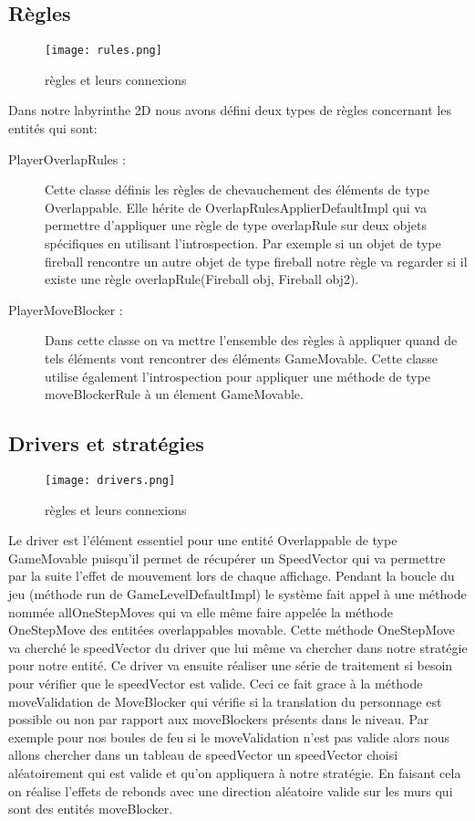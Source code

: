 \documentclass{article}
\begin{document}
\subsection{Règles}

\begin{figure}[!h]
\centering
\texttt{[image: rules.png]}
\caption[Entitées]{règles et leurs connexions}
\end{figure}

Dans notre labyrinthe 2D nous avons défini deux types de règles concernant les entités qui sont:
\begin{description}
\item[PlayerOverlapRules :]Cette classe définis les règles de chevauchement des éléments de type Overlappable. Elle hérite de OverlapRulesApplierDefaultImpl qui va permettre d'appliquer une règle de type overlapRule sur deux objets spécifiques en utilisant l'introspection. Par exemple si un objet de type fireball rencontre un autre objet de type fireball notre règle va regarder si il existe une règle overlapRule(Fireball obj, Fireball obj2).

\item[PlayerMoveBlocker :]Dans cette classe on va mettre l'ensemble des règles à appliquer quand de tels éléments vont rencontrer des éléments GameMovable. Cette classe utilise également l'introspection pour appliquer une méthode de type moveBlockerRule à un élement GameMovable.
\end{description}

\subsection{Drivers et stratégies}

\begin{figure}[!h]
\centering
\texttt{[image: drivers.png]}
\caption[Entitées]{règles et leurs connexions}
\end{figure}

Le driver est l'élément essentiel pour une entité Overlappable de type GameMovable puisqu'il permet de récupérer un SpeedVector qui va permettre par la suite l'effet de mouvement lors de chaque affichage. Pendant la boucle du jeu (méthode run de GameLevelDefaultImpl) le système fait appel à une méthode nommée allOneStepMoves qui va elle même faire appelée la méthode OneStepMove des entitées overlappables movable. Cette méthode OneStepMove va cherché le speedVector du driver que lui même va chercher dans notre stratégie pour notre entité. Ce driver va ensuite réaliser une série de traitement si besoin pour vérifier que le speedVector est valide. Ceci ce fait grace à la méthode moveValidation de MoveBlocker qui vérifie si la translation du personnage est possible ou non par rapport aux moveBlockers présents dans le niveau. Par exemple pour nos boules de feu si le moveValidation n'est pas valide alors nous allons chercher dans un tableau de speedVector un speedVector choisi aléatoirement qui est valide et qu'on appliquera à notre stratégie. En faisant cela on réalise l'effets de rebonds avec une direction aléatoire valide sur les murs qui sont des entités moveBlocker.
\end{document}
